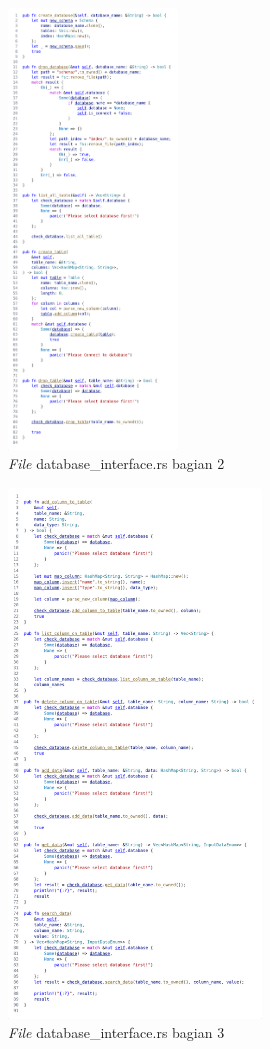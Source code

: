 \begin{figure}[H]
  \centering{}
	\includegraphics[width=0.4\textwidth]{gambar/lampiran/file-database-interface-2.png}
  \caption{\emph{File} database\_interface.rs bagian 2}
\end{figure}

\begin{figure}[H]
  \centering{}
	\includegraphics[width=0.6\textwidth]{gambar/lampiran/file-database-interface-3.png}
  \caption{\emph{File} database\_interface.rs bagian 3}
\end{figure}

